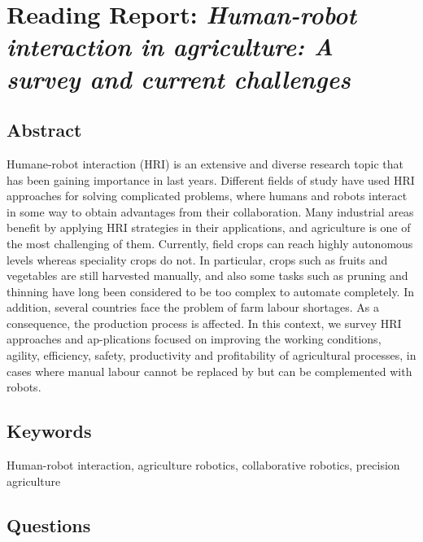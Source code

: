 \documentclass{article}
\begin{document}


\section{Reading Report: \emph{Human-robot interaction in agriculture: A survey and current challenges}}
\cite{Vasconez2019}

\subsection*{Abstract}
Humane-robot interaction (HRI) is an extensive and diverse research topic that has been
gaining importance in last years. Different fields of study have used HRI approaches for
solving complicated problems, where humans and robots interact in some way to obtain
advantages from their collaboration. Many industrial areas benefit by applying HRI strategies in their applications, and agriculture is one of the most challenging of them.
Currently, field crops can reach highly autonomous levels whereas speciality crops do not.
In particular, crops such as fruits and vegetables are still harvested manually, and also
some tasks such as pruning and thinning have long been considered to be too complex to
automate completely. In addition, several countries face the problem of farm labour
shortages. As a consequence, the production process is affected. In this context, we survey
HRI approaches and ap-plications focused on improving the working conditions, agility,
efficiency, safety, productivity and profitability of agricultural processes, in cases where
manual labour cannot be replaced by but can be complemented with robots.

\subsection*{Keywords}
Human-robot interaction, agriculture robotics, collaborative robotics, precision agriculture


\subsection*{Questions}
\end{document}
